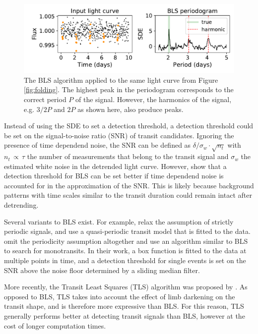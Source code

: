 \begin{figure}
    \centering
    \includegraphics[width=0.7\linewidth]{Background/Figures/BLS_example.pdf}
    \caption{The BLS algorithm applied to the same light curve from Figure \ref{fig:folding}. The highest peak in the periodogram corresponds to the correct period $P$ of the signal. However, the harmonics of the signal, e.g. $3/2P$ and $2P$ as shown here, also produce peaks.}
    \label{fig:bls_example}
\end{figure}

Instead of using the SDE to set a detection threshold, a detection threshold could be set on the signal-to-noise ratio (SNR) of transit candidates. Ignoring the presence of time dependend noise, the SNR can be defined as $\delta / \sigma_w \cdot \sqrt{n_t}$ with $n_t \,\propto\, \tau$ the number of measurements that belong to the transit signal and $\sigma_w$ the estimated white noise in the detrended light curve. However, \cite{pont2006effect} show that a detection threshold for BLS can be set better if time dependend noise is accounted for in the approximation of the SNR. This is likely because background patterns with time scales similar to the transit duration could remain intact after detrending.

Several variants to BLS exist. For example, \cite{carter2013quasiperiodic} relax the assumption of strictly periodic signals, and use a quasi-periodic transit model that is fitted to the data. \cite{foreman2016population} omit the periodicity assumption altogether and use an algorithm similar to BLS to search for monotransits. In their work, a box function is fitted to the data at multiple points in time, and a detection threshold for single events is set on the SNR above the noise floor determined by a sliding median filter.

More recently, the Transit Least Squares (TLS) algorithm was proposed by \cite{hippke2019optimized}. As opposed to BLS, TLS takes into account the effect of limb darkening on the transit shape, and is therefore more expressive than BLS. For this reason, TLS generally performs better at detecting transit signals than BLS, however at the cost of longer computation times.

